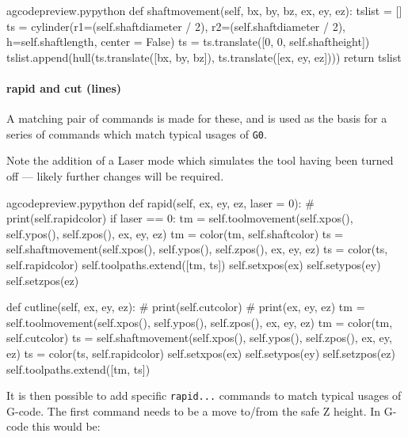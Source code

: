 \documentclass{ltxdoc}
\begin{document}
\lstset{firstnumber=\thegcpy}
\begin{writecode}{a}{gcodepreview.py}{python}
    def shaftmovement(self, bx, by, bz, ex, ey, ez):
        tslist = []
        ts = cylinder(r1=(self.shaftdiameter / 2), r2=(self.shaftdiameter / 2), h=self.shaftlength, center = False)
        ts = ts.translate([0, 0, self.shaftheight])
        tslist.append(hull(ts.translate([bx, by, bz]), ts.translate([ex, ey, ez])))
        return tslist

\end{writecode}
\addtocounter{gcpy}{23}

\paragraph{rapid and cut (lines)}

A matching pair of commands is made for these, and  is used as the basis for a series of commands which match typical usages of \verb|G0|.

Note the addition of a Laser mode which simulates the tool having been turned off --- likely further changes will be required.

\lstset{firstnumber=\thegcpy}
\begin{writecode}{a}{gcodepreview.py}{python}
    def rapid(self, ex, ey, ez, laser = 0):
#        print(self.rapidcolor)
        if laser == 0:
            tm = self.toolmovement(self.xpos(), self.ypos(), self.zpos(), ex, ey, ez)
            tm = color(tm, self.shaftcolor)
            ts = self.shaftmovement(self.xpos(), self.ypos(), self.zpos(), ex, ey, ez)
            ts = color(ts, self.rapidcolor)
            self.toolpaths.extend([tm, ts])
        self.setxpos(ex)
        self.setypos(ey)
        self.setzpos(ez)

    def cutline(self, ex, ey, ez):
#        print(self.cutcolor)
#        print(ex, ey, ez)
        tm = self.toolmovement(self.xpos(), self.ypos(), self.zpos(), ex, ey, ez)
        tm = color(tm, self.cutcolor)
        ts = self.shaftmovement(self.xpos(), self.ypos(), self.zpos(), ex, ey, ez)
        ts = color(ts, self.rapidcolor)
        self.setxpos(ex)
        self.setypos(ey)
        self.setzpos(ez)
        self.toolpaths.extend([tm, ts])

\end{writecode}
\addtocounter{gcpy}{23}

It is then possible to add specific \verb|rapid...| commands to match typical usages of G-code. The first command needs to be a move to/from the safe Z height. In G-code this would be:
\end{document}
